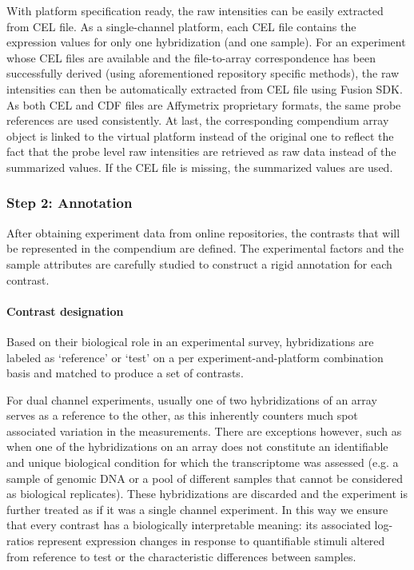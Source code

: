 With platform specification ready, the raw intensities can be easily extracted from CEL file. As a single-channel platform, each CEL file contains the expression values for only one hybridization (and one sample). For an experiment whose CEL files are available and the file-to-array correspondence has been successfully derived (using aforementioned repository specific methods), the raw intensities can then be automatically extracted from CEL file using Fusion SDK. As both CEL and CDF files are Affymetrix proprietary formats, the same probe references are used consistently. At last, the corresponding compendium array object is linked to the virtual platform instead of the original one to reflect the fact that the probe level raw intensities are retrieved as raw data instead of the summarized values. If the CEL file is missing, the summarized values are used. 






\subsubsection{Step 2: Annotation}

After obtaining experiment data from online repositories, the contrasts that will be represented in the compendium are defined.  The experimental factors and the sample attributes are carefully studied to construct a rigid annotation for each contrast.  

\paragraph{Contrast designation}
Based on their biological role in an experimental survey, hybridizations are labeled as `reference' or `test' on a per experiment-and-platform combination basis and matched to produce a set of contrasts.

For dual channel experiments, usually one of two hybridizations of an array serves as a reference to the other, as this inherently counters much spot associated variation in the measurements. There are exceptions however, such as when one of the hybridizations on an array does not constitute an identifiable and unique biological condition for which the transcriptome was assessed (e.g. a sample of genomic DNA or a pool of different samples that cannot be considered as biological replicates). These hybridizations are discarded and the experiment is further treated as if it was a single channel experiment. In this way we ensure that every contrast has a biologically interpretable meaning: its associated log-ratios represent expression changes in response to quantifiable stimuli altered from reference to test or the characteristic differences between samples.


